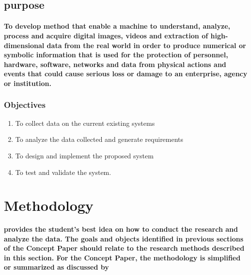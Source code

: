 \documentclass[11pt]{article}
\begin{document}
	 \subsection{\textbf{purpose}}
	 
	   \paragraph{\textmd{To develop method that enable a machine to understand, analyze, process and acquire digital images, videos and extraction of high-dimensional data from the real world in order to produce numerical or symbolic information that is used for the protection of personnel, hardware, software, networks and data from physical actions and events that could cause serious loss or damage to an enterprise, agency or institution.}}
	   
	   \subsubsection{\textbf{ Objectives}}
	   
	   \begin{enumerate}
	   
	   \item To collect data on the current existing systems
	   \item To analyze the data collected and generate requirements
	   \item To design and implement the proposed system 
	   \item To test and validate the system.
	           
	   \end{enumerate} 	  

	   
	   
	   
	   \section{\textbf{Methodology}}
	   \paragraph{\textmd{provides the student’s best idea on how to conduct the research and analyze the data. The goals and objects identified in previous sections of the Concept Paper should relate to the research methods described in this section.  For the Concept Paper, the methodology is simplified or summarized as discussed by }}
	   
	
    	
    	 
       
\end{document}
